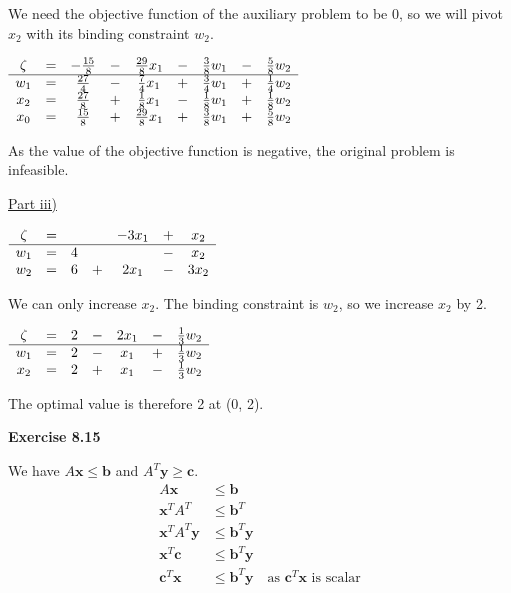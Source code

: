 \documentclass[letterpaper,12pt]{article}
\newcommand{\vect}[1]{\mathbf{#1}}
\begin{document}
We need the objective function of the auxiliary problem to be 0, so we will pivot $x_2$ with its binding constraint $w_2$.
\begin{center}
	$\begin{array}{ c c c c c c c c c c }
	\zeta & = & -\frac{15}{8} & - & \frac{29}{8}x_1 & - & \frac{3}{8}w_1 & - & \frac{5}{8}w_2 \\
	\hline
	w_1 & = & \frac{27}{4} & - & \frac{7}{4}x_1 & + & \frac{3}{4}w_1 & + & \frac{1}{4}w_2 \\
	x_2 & = & \frac{27}{8}  & + & \frac{1}{8}x_1 & - & \frac{1}{8}w_1 & + & \frac{1}{8}w_2 \\
	x_0 & = & \frac{15}{8}  & + & \frac{29}{8}x_1  & +  &  \frac{3}{8}w_1 & + & \frac{5}{8}w_2 \\
	\end{array}$ \\
\end{center}
As the value of the objective function is negative, the original problem is infeasible.

\underline{Part iii)}

\begin{center}
	$\begin{array}{ c c c c c c c c  }
	\zeta & = & & & -3x_1 & + & x_2 \\
	\hline
	w_1 & = & 4 & & & - & x_2 \\
	w_2 & = & 6 & + & 2x_1 & - & 3x_2 \\
	\end{array}$ \\
\end{center}

We can only increase $x_2$. The binding constraint is $w_2$, so we increase $x_2$ by 2.

\begin{center}
 	$\begin{array}{ c c c c c c c c  }
 	\zeta & = & 2 & - & 2x_1 & - & \frac{1}{3}w_2 \\
 	\hline
 	w_1 & = & 2 & - & x_1 & + & \frac{1}{3}w_2 \\
 	x_2 & = & 2 & + & x_1 & - & \frac{1}{3}w_2 \\
 	\end{array}$ \\
\end{center}

The optimal value is therefore 2 at (0, 2).

\textbf{Exercise 8.15}

We have $A \vect{x} \leq \vect{b}$ and $A^T \vect{y} \geq \vect{c}$.
\begin{align*}
A \vect{x} &\leq \vect{b} \\
\vect{x}^T A^T &\leq \vect{b}^T \\
\vect{x}^T A^T \vect{y} &\leq \vect{b}^T \vect{y} \\
\vect{x}^T \vect{c} &\leq \vect{b}^T \vect{y} \\
\vect{c}^T \vect{x} &\leq \vect{b}^T \vect{y} \quad \text{as } {\vect{c}^T \vect{x}} \text{ is scalar}\\
\end{align*}
\end{document}
